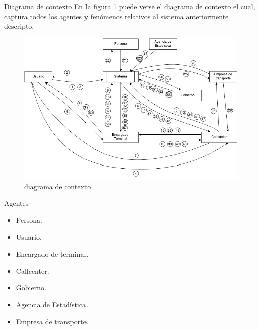 
\begin{subsection}{Diagrama de contexto}
En la figura \ref{fig:diagrama_contexto} puede verse el diagrama de contexto el cual, captura todos los agentes y fenómenos relativos al sistema anteriormente descripto.

\begin{figure}[!ht]
\begin{center}
\includegraphics[scale=0.60]{imagenes/diagrama_contexto.png}
\caption{diagrama de contexto}
\label{fig:diagrama_contexto}
\end{center}
\end{figure}
\end{subsection}

\begin{subsection}{Agentes}
	\begin{itemize}
	\item Persona.
	\item Usuario.
	\item Encargado de terminal.
	\item Callcenter.
	\item Gobierno.
	\item Agencia de Estadística.
	\item Empresa de transporte.
	\end{itemize}
\end{subsection}

